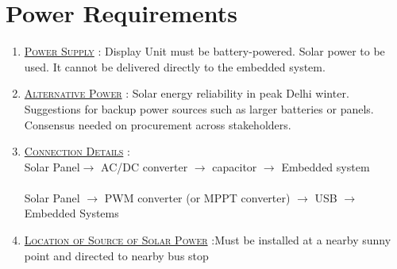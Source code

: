 \section{Power Requirements}

\begin{enumerate}
    \item {}\underline{\textsc{Power Supply}} : Display Unit must be battery-powered. Solar power to be used. It cannot be delivered directly to the embedded system.

    \item \underline{\textsc{Alternative Power}} : Solar energy reliability in peak Delhi winter. Suggestions for backup power sources such as larger batteries or panels. Consensus needed on procurement across stakeholders.

    \item \underline{\textsc{Connection Details}} : \\Solar Panel$\to$ AC/DC converter $\to$ capacitor $\to$ Embedded system \\ \\
Solar Panel $\to$ PWM converter (or MPPT converter) $\to$ USB $\to$ Embedded Systems

    \item \underline{\textsc{Location of Source of Solar Power}} :Must be installed at a nearby sunny point and directed to nearby bus stop
\end{enumerate}